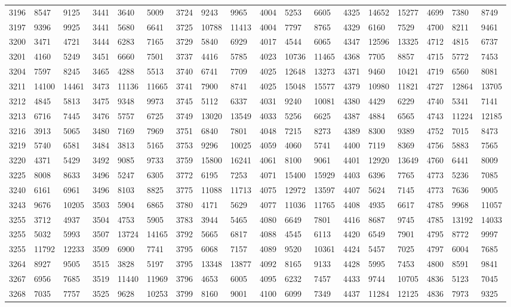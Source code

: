 \begin{center}
\begin{longtable}{*5{A@{\hspace*{5mm}}A}}
3196&8547&9125&3441&3640&5009&3724&9243&9965&4004&5253&6605&4325&14652&15277&4699&7380&8749\\
3197&9396&9925&3441&5680&6641&3725&10788&11413&4004&7797&8765&4329&6160&7529&4700&8211&9461\\
3200&3471&4721&3444&6283&7165&3729&5840&6929&4017&4544&6065&4347&12596&13325&4712&4815&6737\\
3201&4160&5249&3451&6660&7501&3737&4416&5785&4023&10736&11465&4368&7705&8857&4715&5772&7453\\
3204&7597&8245&3465&4288&5513&3740&6741&7709&4025&12648&13273&4371&9460&10421&4719&6560&8081\\
3211&14100&14461&3473&11136&11665&3741&7900&8741&4025&15048&15577&4379&10980&11821&4727&12864&13705\\
3212&4845&5813&3475&9348&9973&3745&5112&6337&4031&9240&10081&4380&4429&6229&4740&5341&7141\\
3213&6716&7445&3476&5757&6725&3749&13020&13549&4033&5256&6625&4387&4884&6565&4743&11224&12185\\
3216&3913&5065&3480&7169&7969&3751&6840&7801&4048&7215&8273&4389&8300&9389&4752&7015&8473\\
3219&5740&6581&3484&3813&5165&3753&9296&10025&4059&4060&5741&4400&7119&8369&4756&5883&7565\\
3220&4371&5429&3492&9085&9733&3759&15800&16241&4061&8100&9061&4401&12920&13649&4760&6441&8009\\
3225&8008&8633&3496&5247&6305&3772&6195&7253&4071&15400&15929&4403&6396&7765&4773&5236&7085\\
3240&6161&6961&3496&8103&8825&3775&11088&11713&4075&12972&13597&4407&5624&7145&4773&7636&9005\\
3243&9676&10205&3503&5904&6865&3780&4171&5629&4077&11036&11765&4408&4935&6617&4785&9968&11057\\
3255&3712&4937&3504&4753&5905&3783&3944&5465&4080&6649&7801&4416&8687&9745&4785&13192&14033\\
3255&5032&5993&3507&13724&14165&3792&5665&6817&4088&4545&6113&4420&6549&7901&4795&8772&9997\\
3255&11792&12233&3509&6900&7741&3795&6068&7157&4089&9520&10361&4424&5457&7025&4797&6004&7685\\
3264&8927&9505&3515&3828&5197&3795&13348&13877&4092&8165&9133&4428&5995&7453&4800&8591&9841\\
3267&6956&7685&3519&11440&11969&3796&4653&6005&4095&6232&7457&4433&9744&10705&4836&5123&7045\\
3268&7035&7757&3525&9628&10253&3799&8160&9001&4100&6099&7349&4437&11284&12125&4836&7973&9325\\

\end{longtable}
\end{center}
